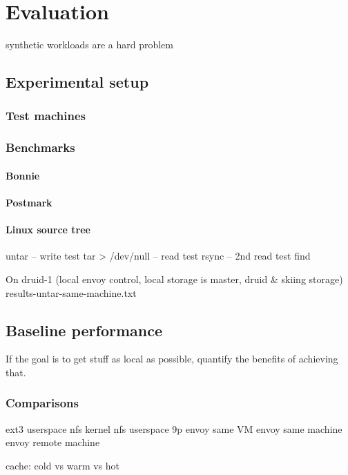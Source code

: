 \chapter{Evaluation}\label{cha:evaluation}
synthetic workloads are a hard problem \cite{ganger95}
\section{Experimental setup}

\subsection{Test machines}

\subsection{Benchmarks}

\subsubsection{Bonnie}
\subsubsection{Postmark}

\subsubsection{Linux source tree}
untar -- write test
tar > /dev/null -- read test
rsync -- 2nd read test
find

On druid-1 (local envoy control, local storage is master, druid \& skiing storage)
results-untar-same-machine.txt



\section{Baseline performance}

If the goal is to get stuff as local as possible, quantify the benefits of achieving that.

\subsection{Comparisons}

ext3
userspace nfs
kernel nfs
userspace 9p
envoy same VM
envoy same machine
envoy remote machine

cache: cold vs warm vs hot

